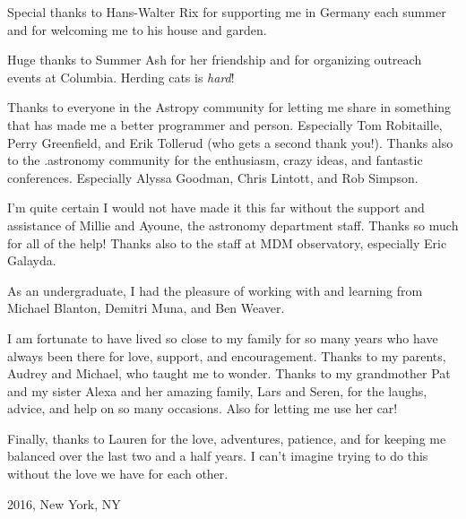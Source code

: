 Special thanks to Hans-Walter Rix for supporting me in Germany each summer and
for welcoming me to his house and garden.

Huge thanks to Summer Ash for her friendship and for organizing outreach events
at Columbia. Herding cats is \emph{hard}!

Thanks to everyone in the Astropy community for letting me share in something
that has made me a better programmer and person. Especially Tom Robitaille,
Perry Greenfield, and Erik Tollerud (who gets a second thank you!). Thanks also
to the .astronomy community for the enthusiasm, crazy ideas, and fantastic
conferences. Especially Alyssa Goodman, Chris Lintott, and Rob Simpson.

I'm quite certain I would not have made it this far without the support and
assistance of Millie and Ayoune, the astronomy department staff. Thanks so much
for all of the help! Thanks also to the staff at MDM observatory, especially
Eric Galayda.

As an undergraduate, I had the pleasure of working with and learning from
Michael Blanton, Demitri Muna, and Ben Weaver.

I am fortunate to have lived so close to my family for so many years who have
always been there for love, support, and encouragement. Thanks to my parents,
Audrey and Michael, who taught me to wonder. Thanks to my grandmother Pat and my
sister Alexa and her amazing family, Lars and Seren, for the laughs, advice, and
help on so many occasions. Also for letting me use her car!

Finally, thanks to Lauren for the love, adventures, patience, and for keeping me
balanced over the last two and a half years. I can't imagine trying to do this
without the love we have for each other.

\vspace{1.8cm}
2016, New York, NY

